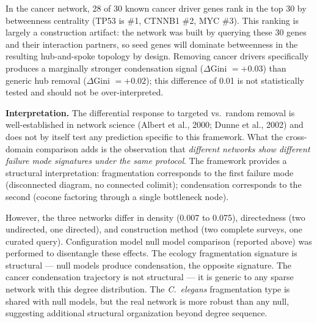 \documentclass[12pt,a4paper]{article}
\begin{document}
In the cancer network, 28 of 30 known cancer driver genes rank in the top 30 by betweenness centrality (TP53 is \#1, CTNNB1 \#2, MYC \#3). This ranking is largely a construction artifact: the network was built by querying these 30 genes and their interaction partners, so seed genes will dominate betweenness in the resulting hub-and-spoke topology by design. Removing cancer drivers specifically produces a marginally stronger condensation signal ($\Delta$Gini $= +0.03$) than generic hub removal ($\Delta$Gini $= +0.02$); this difference of 0.01 is not statistically tested and should not be over-interpreted.

\textbf{Interpretation.} The differential response to targeted vs.\ random removal is well-established in network science (Albert et al., 2000; Dunne et al., 2002) and does not by itself test any prediction specific to this framework. What the cross-domain comparison adds is the observation that \emph{different networks show different failure mode signatures under the same protocol}. The framework provides a structural interpretation: fragmentation corresponds to the first failure mode (disconnected diagram, no connected colimit); condensation corresponds to the second (cocone factoring through a single bottleneck node).

However, the three networks differ in density (0.007 to 0.075), directedness (two undirected, one directed), and construction method (two complete surveys, one curated query). Configuration model null model comparison (reported above) was performed to disentangle these effects. The ecology fragmentation signature is structural --- null models produce condensation, the opposite signature. The cancer condensation trajectory is not structural --- it is generic to any sparse network with this degree distribution. The \textit{C.~elegans} fragmentation type is shared with null models, but the real network is more robust than any null, suggesting additional structural organization beyond degree sequence.
\end{document}

